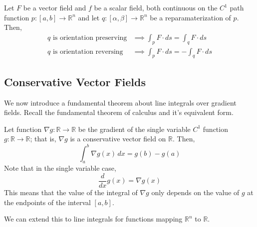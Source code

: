   \begin{theorem}
  Let $F$ be a vector field and $f$ be a scalar field, both continuous on the $C^1$ path function $p: [a,b] \longrightarrow \mathbb{R}^n$ and let $q: [\alpha, \beta] \longrightarrow \mathbb{R}^n$ be a reparamaterization of $p$. Then, 
  \begin{align*}
      q \text{ is orientation preserving} & \implies \int_p F \cdot d s = \int_q F \cdot d s \\
      q \text{ is orientation reversing} & \implies \int_p F \cdot d s = - \int_q F \cdot d s
  \end{align*}
  \end{theorem}

\subsection{Conservative Vector Fields}

  We now introduce a fundamental theorem about line integrals over gradient fields. Recall the fundamental theorem of calculus and it's equivalent form. 

  \begin{theorem}
  Let function $\nabla g: \mathbb{R} \longrightarrow \mathbb{R}$ be the gradient of the single variable $C^1$ function $g: \mathbb{R} \longrightarrow \mathbb{R}$; that is, $\nabla g$ is a conservative vector field on $\mathbb{R}$. Then, 
  \[\int_a^b \nabla g (x) \,dx = g(b) - g(a)\]
  Note that in the single variable case, 
  \[\frac{d}{dx} g(x) = \nabla g(x)\]
  This means that the value of the integral of $\nabla g$ only depends on the value of $g$ at the endpoints of the interval $[a,b]$. 
  \end{theorem}

  We can extend this to line integrals for functions mapping $\mathbb{R}^n$ to $\mathbb{R}$. 

